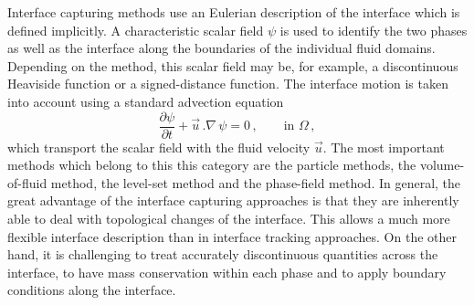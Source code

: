 Interface capturing methods use an Eulerian description of the interface which
is defined implicitly. A characteristic scalar field $\psi$ is used to identify
the two phases as well as the interface along the boundaries of the individual
fluid domains. Depending on the method, this scalar field may be, for example,
a discontinuous Heaviside function or a signed-distance function. The interface
motion is taken into account using a standard advection equation
\begin{equation}
\frac{\partial \psi}{\partial t}+\vec u\,.\nabla\,\psi=0\,,\qquad \mbox{in }
\Omega\,,
\end{equation}
which transport the scalar field with the fluid velocity $\vec u$. The most
important methods which belong to this this category are the particle methods,
the volume-of-fluid method, the level-set method and the phase-field method. In
general, the great advantage of the interface capturing approaches is that they
are inherently able to deal with topological changes of the interface. This
allows a much more flexible interface description than in interface tracking
approaches. On the other hand, it is challenging to treat accurately
discontinuous quantities across the interface, to have mass conservation
within each phase and to apply boundary conditions along the interface.


